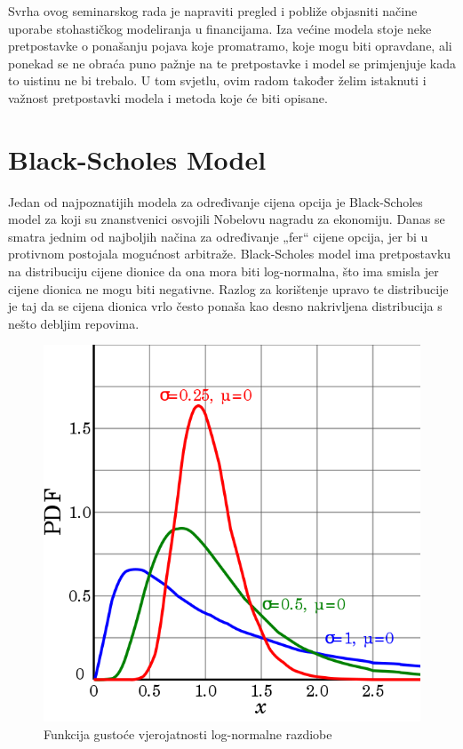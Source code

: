 \documentclass[times, utf8, seminar]{fer}
\begin{document}
Svrha ovog seminarskog rada je napraviti pregled i pobliže objasniti načine uporabe stohastičkog modeliranja u financijama. Iza većine modela stoje neke pretpostavke o ponašanju pojava koje promatramo, koje mogu biti opravdane, ali ponekad se ne obraća puno pažnje na te pretpostavke i model se primjenjuje kada to uistinu ne bi trebalo. U tom svjetlu, ovim radom također želim istaknuti i važnost pretpostavki modela i metoda koje će biti opisane.

\chapter{Black-Scholes Model}

Jedan od najpoznatijih modela za određivanje cijena opcija je Black-Scholes model za koji su znanstvenici osvojili Nobelovu nagradu za ekonomiju. Danas se smatra jednim od najboljih načina za određivanje „fer“ cijene opcija, jer bi u protivnom postojala mogućnost arbitraže. Black-Scholes model ima pretpostavku na distribuciju cijene dionice da ona mora biti log-normalna, što ima smisla jer cijene dionica ne mogu biti negativne. Razlog za korištenje upravo te distribucije je taj da se cijena dionica vrlo često ponaša kao desno nakrivljena distribucija s nešto debljim repovima.

\begin{figure}[h!]
\centering
\includegraphics[scale=0.4]{img/log_normal_pdf.png}
\caption{Funkcija gustoće vjerojatnosti log-normalne razdiobe}
\label{fig:log_normal_pdf}
\end{figure}
\end{document}
